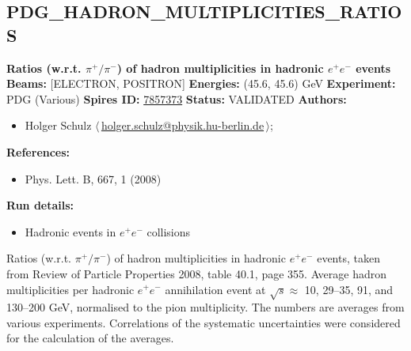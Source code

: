 \subsection[PDG\_HADRON\_MULTIPLICITIES\_RATIOS]{PDG\_HADRON\_MULTIPLICITIES\_RATIOS\,\cite{Amsler:2008zzb}}
\textbf{Ratios (w.r.t. $\pi^+/\pi^-$) of hadron multiplicities in hadronic $e^+e^-$ events}\newline
\textbf{Beams:} [ELECTRON, POSITRON] \newline
\textbf{Energies:} (45.6, 45.6) GeV \newline
\textbf{Experiment:} PDG (Various) \newline
\textbf{Spires ID:} \href{http://www.slac.stanford.edu/spires/find/hep/www?rawcmd=key+7857373}{7857373}\newline
\textbf{Status:} VALIDATED\newline
\textbf{Authors:}
\begin{itemize}
  \item Holger Schulz $\langle\,$\href{mailto:holger.schulz@physik.hu-berlin.de}{holger.schulz@physik.hu-berlin.de}$\,\rangle$;
\end{itemize}
\textbf{References:}
\begin{itemize}
  \item Phys. Lett. B, 667, 1 (2008)
\end{itemize}
\textbf{Run details:}
\begin{itemize}

  \item Hadronic events in $e^+ e^-$ collisions\end{itemize}

\noindent Ratios (w.r.t. $\pi^+/\pi^-$) of hadron multiplicities in hadronic $e^+ e^-$ events, taken from Review of Particle Properties 2008, table 40.1, page 355.  Average hadron multiplicities per hadronic $e^+ e^-$ annihilation event at $\sqrt{s} \approx$ 10, 29--35, 91, and 130--200 GeV, normalised to the pion multiplicity. The numbers are averages from various experiments. Correlations of the systematic uncertainties were considered for the calculation of the averages.

\clearpage


\clearpage

